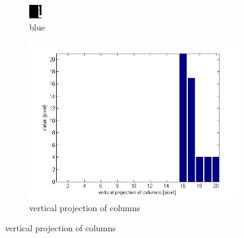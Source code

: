 \begin{figure}[htbp]
\begin{subfigure}[t]{0.1\textwidth}
        \includegraphics[width=\textwidth]{1b.jpg}
        \caption{blue}
  \end{subfigure}
    \begin{subfigure}[c]{0.4\textwidth}
        \includegraphics[width=\textwidth]{1c.jpg}
        \caption{vertical projection of columns}
  \end{subfigure}
  

\end{figure}
